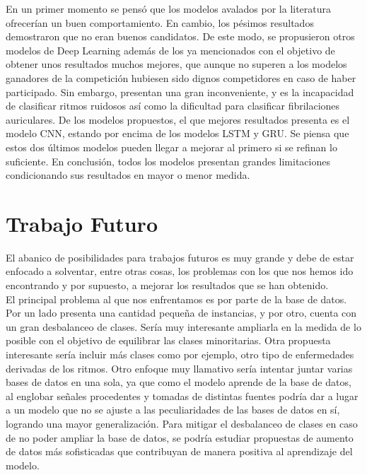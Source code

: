     En un primer momento se pensó que los modelos avalados por la literatura ofrecerían un buen comportamiento. En cambio, los pésimos resultados demostraron que no eran buenos candidatos. De este modo, se propusieron otros modelos de Deep Learning además de los ya mencionados con el objetivo de obtener unos resultados muchos mejores, que aunque no superen a los modelos ganadores de la competición hubiesen sido dignos competidores en caso de haber participado. Sin embargo, presentan una gran inconveniente, y es la incapacidad de clasificar ritmos ruidosos así como la dificultad para clasificar fibrilaciones auriculares. De los modelos propuestos, el que mejores resultados presenta es el modelo CNN, estando por encima de los modelos LSTM y GRU. Se piensa que estos dos últimos modelos pueden llegar a mejorar al primero si se refinan lo suficiente. En conclusión, todos los modelos presentan grandes limitaciones condicionando sus resultados en mayor o menor medida.\\
    

    
    \section{Trabajo Futuro}
    
    El abanico de posibilidades para trabajos futuros es muy grande y debe de estar enfocado a solventar, entre otras cosas, los problemas con los que nos hemos ido encontrando y por supuesto, a mejorar los resultados que se han obtenido.  \\ 
    
    El principal problema al que nos enfrentamos es por parte de la base de datos. Por un lado presenta una cantidad pequeña de instancias, y por otro, cuenta con un gran desbalanceo de clases. Sería muy interesante ampliarla en la medida de lo posible con el objetivo de equilibrar las clases minoritarias. Otra propuesta interesante sería incluir más clases como por ejemplo, otro tipo de enfermedades derivadas de los ritmos. Otro enfoque muy llamativo sería intentar juntar varias bases de datos en una sola, ya que como el modelo aprende de la base de datos, al englobar señales procedentes y tomadas de distintas fuentes podría dar a lugar a un modelo que no se ajuste a las peculiaridades de las bases de datos en sí, logrando una mayor generalización. Para mitigar el desbalanceo de clases en caso de no poder ampliar la base de datos, se podría estudiar propuestas de aumento de datos más sofisticadas que contribuyan de manera positiva al aprendizaje del modelo. \\
    
